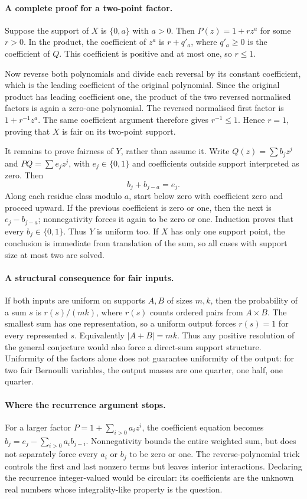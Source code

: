 \documentclass[11pt,a4paper]{article}
\begin{document}
\paragraph{A complete proof for a two-point factor.}
Suppose the support of $X$ is $\{0,a\}$ with $a>0$. Then $P(z)=1+rz^a$ for some $r>0$. In the product, the coefficient of $z^a$ is $r+q'_a$, where $q'_a\geq0$ is the coefficient of $Q$. This coefficient is positive and at most one, so $r\leq1$.

Now reverse both polynomials and divide each reversal by its constant coefficient, which is the leading coefficient of the original polynomial. Since the original product has leading coefficient one, the product of the two reversed normalised factors is again a zero-one polynomial. The reversed normalised first factor is $1+r^{-1}z^a$. The same coefficient argument therefore gives $r^{-1}\leq1$. Hence $r=1$, proving that $X$ is fair on its two-point support.

It remains to prove fairness of $Y$, rather than assume it. Write $Q(z)=\sum b_jz^j$ and $P Q=\sum e_jz^j$, with $e_j\in\{0,1\}$ and coefficients outside support interpreted as zero. Then
\[
 b_j+b_{j-a}=e_j.
\]
Along each residue class modulo $a$, start below zero with coefficient zero and proceed upward. If the previous coefficient is zero or one, then the next is $e_j-b_{j-a}$; nonnegativity forces it again to be zero or one. Induction proves that every $b_j\in\{0,1\}$. Thus $Y$ is uniform too. If $X$ has only one support point, the conclusion is immediate from translation of the sum, so all cases with support size at most two are solved.

\paragraph{A structural consequence for fair inputs.}
If both inputs are uniform on supports $A,B$ of sizes $m,k$, then the probability of a sum $s$ is $r(s)/(mk)$, where $r(s)$ counts ordered pairs from $A\times B$. The smallest sum has one representation, so a uniform output forces $r(s)=1$ for every represented $s$. Equivalently $|A+B|=mk$. Thus any positive resolution of the general conjecture would also force a direct-sum support structure. Uniformity of the factors alone does not guarantee uniformity of the output: for two fair Bernoulli variables, the output masses are one quarter, one half, one quarter.

\paragraph{Where the recurrence argument stops.}
For a larger factor $P=1+\sum_{i>0}a_iz^i$, the coefficient equation becomes $b_j=e_j-\sum_{i>0}a_ib_{j-i}$. Nonnegativity bounds the entire weighted sum, but does not separately force every $a_i$ or $b_j$ to be zero or one. The reverse-polynomial trick controls the first and last nonzero terms but leaves interior interactions. Declaring the recurrence integer-valued would be circular: its coefficients are the unknown real numbers whose integrality-like property is the question.
\end{document}
